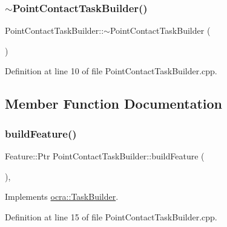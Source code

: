\subsubsection{\texorpdfstring{$\sim$\+Point\+Contact\+Task\+Builder()}{~PointContactTaskBuilder()}}
{\footnotesize\ttfamily Point\+Contact\+Task\+Builder\+::$\sim$\+Point\+Contact\+Task\+Builder (\begin{DoxyParamCaption}{ }\end{DoxyParamCaption})\hspace{0.3cm}{\ttfamily [virtual]}}



Definition at line 10 of file Point\+Contact\+Task\+Builder.\+cpp.



\subsection{Member Function Documentation}
\hypertarget{classocra_1_1PointContactTaskBuilder_a220c35d105a88cd0e2407779ab1556f2}{}\label{classocra_1_1PointContactTaskBuilder_a220c35d105a88cd0e2407779ab1556f2} 
\subsubsection{\texorpdfstring{build\+Feature()}{buildFeature()}}
{\footnotesize\ttfamily Feature\+::\+Ptr Point\+Contact\+Task\+Builder\+::build\+Feature (\begin{DoxyParamCaption}{ }\end{DoxyParamCaption})\hspace{0.3cm}{\ttfamily [protected]}, {\ttfamily [virtual]}}



Implements \hyperlink{classocra_1_1TaskBuilder_a58c0dc416a9607a344a080248ee26ac2}{ocra\+::\+Task\+Builder}.



Definition at line 15 of file Point\+Contact\+Task\+Builder.\+cpp.

\hypertarget{classocra_1_1PointContactTaskBuilder_a253f8fffbd548b63badee23e2c42eb95}{}\label{classocra_1_1PointContactTaskBuilder_a253f8fffbd548b63badee23e2c42eb95} 
